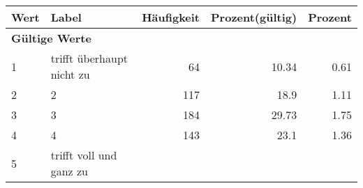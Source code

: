      \begin{longtable}{lXrrr}
     \toprule
     \textbf{Wert} & \textbf{Label} & \textbf{Häufigkeit} & \textbf{Prozent(gültig)} & \textbf{Prozent} \\
     \endhead
     \midrule
     \multicolumn{5}{l}{\textbf{Gültige Werte}}\\

     1 &
     \multicolumn{1}{X}{ trifft überhaupt nicht zu   } &


       \num{64} &
       \num[round-mode=places,round-precision=2]{10,34} &
         \num[round-mode=places,round-precision=2]{0,61} \\

     2 &
     \multicolumn{1}{X}{ 2   } &


       \num{117} &
       \num[round-mode=places,round-precision=2]{18,9} &
         \num[round-mode=places,round-precision=2]{1,11} \\

     3 &
     \multicolumn{1}{X}{ 3   } &


       \num{184} &
       \num[round-mode=places,round-precision=2]{29,73} &
         \num[round-mode=places,round-precision=2]{1,75} \\

     4 &
     \multicolumn{1}{X}{ 4   } &


       \num{143} &
       \num[round-mode=places,round-precision=2]{23,1} &
         \num[round-mode=places,round-precision=2]{1,36} \\

     5 &
     \multicolumn{1}{X}{ trifft voll und ganz zu   } &



\end{longtable}
